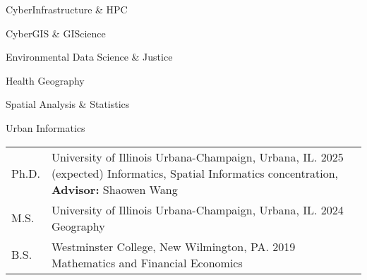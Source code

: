 \documentclass{acmcv}
\begin{document}
	\begin{multicols}{2}
		\begin{titemize}
			\item CyberInfrastructure \& HPC
			\item CyberGIS \& GIScience
			\item Environmental Data Science \& Justice
			\item Health Geography
			\item Spatial Analysis \& Statistics
            \item Urban Informatics
		\end{titemize}
	\end{multicols}


    \begin{longtable}{p{0.1\linewidth} p{0.9\linewidth}}
        Ph.D. & University of Illinois Urbana-Champaign, Urbana, IL. 2025 (expected) \newline Informatics, Spatial Informatics concentration, \textbf{Advisor:} Shaowen Wang \\

        M.S. & University of Illinois Urbana-Champaign, Urbana, IL. 2024 \newline Geography\\

        B.S. & Westminster College, New Wilmington, PA. 2019 \newline Mathematics and Financial Economics\\
    \end{longtable}
    \vspace*{-0.25cm}

		\vspace{-.6cm}
        \nocite{*}
        \newrefcontext[labelprefix=J]
		\printbibliography[title={\normalsize {Journal Articles}},type=article, keyword=journalarticle]
		\vspace{-.8cm}
        \newrefcontext[labelprefix=C]
		\printbibliography[title={\normalsize {Peer-Reviewed Conference Papers}},type=inproceedings, keyword=confpaper]
		\vspace{-.8cm}
        \newrefcontext[labelprefix=A]
        \printbibliography[title={\normalsize {Conference Abstracts}}, keyword=extabs]
	
\end{document}
